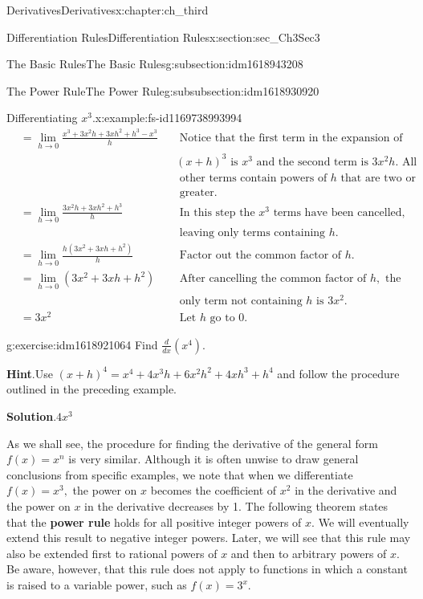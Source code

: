\documentclass[oneside,10pt,]{book}
\newcommand{\blocktitlefont}{\relax}
\newcommand{\terminology}[1]{\textbf{#1}}
\numberwithin{equation}{section}
\newcommand{\amp}{&}
\begin{document}
\begin{chapterptx}{Derivatives}{}{Derivatives}{}{}{x:chapter:ch_third}
\begin{sectionptx}{Differentiation Rules}{}{Differentiation Rules}{}{}{x:section:sec_Ch3Sec3}
\begin{subsectionptx}{The Basic Rules}{}{The Basic Rules}{}{}{g:subsection:idm1618943208}
\begin{subsubsectionptx}{The Power Rule}{}{The Power Rule}{}{}{g:subsubsection:idm1618930920}
\begin{example}{Differentiating \(x^3\).}{x:example:fs-id1169738993994}
\begin{align*}
\amp=\lim_{h\to 0}\frac{x^3+3x^2h+3xh^2+h^3-x^3}{h}\amp \amp \text{ Notice that the first term in the expansion of }\\
\amp \amp \amp (x+h)^3 \text{ is } x^3 \text{ and the second term is } 3x^2h. \text{ All }\\
\amp \amp \amp \text{ other terms contain powers of } h \text{ that are two or }\\
\amp \amp \amp \text{ greater. }\\
\amp =\lim_{h\to 0}\frac{3x^2h+3xh^2+h^3}{h}\amp \amp\text{ In this step the } x^3 \text{ terms have been cancelled, }\\
\amp \amp \amp \text{ leaving only terms containing } h.\\
\amp=\lim_{h\to 0}\frac{h(3x^2+3xh+h^2)}{h}\amp \amp \text{ Factor out the common factor of } h.\\
\amp =\lim_{h\to 0}(3x^2+3xh+h^2)\amp \amp \text{ After cancelling the common factor of } h,\text{ the }\\
\amp \amp \amp \text{ only term not containing } h \text{ is } 3x^2.\\
\amp=3x^2\amp \amp \text{ Let } h \text{ go to 0. }
\end{align*}
\end{example}
\begin{inlineexercise}{}{g:exercise:idm1618921064}%
Find \(\frac{d}{dx}(x^4).\)%
\par\smallskip%
\noindent\textbf{\blocktitlefont Hint}.\hypertarget{g:hint:idm1618920808}{}\quad{}Use \((x+h)^4=x^4+4x^3h+6x^2h^2+4xh^3+h^4\) and follow the procedure outlined in the preceding example.%
\par\smallskip%
\noindent\textbf{\blocktitlefont Solution}.\hypertarget{g:solution:idm1618921576}{}\quad{}\(4x^3\)%
\end{inlineexercise}%
As we shall see, the procedure for finding the derivative of the general form \(f(x)=x^n\) is very similar. Although it is often unwise to draw general conclusions from specific examples, we note that when we differentiate \(f(x)=x^3,\) the power on \(x\) becomes the coefficient of \(x^2\) in the derivative and the power on \(x\) in the derivative decreases by 1. The following theorem states that the \terminology{power rule} holds for all positive integer powers of \(x.\) We will eventually extend this result to negative integer powers. Later, we will see that this rule may also be extended first to rational powers of \(x\) and then to arbitrary powers of \(x.\) Be aware, however, that this rule does not apply to functions in which a constant is raised to a variable power, such as \(f(x)=3^x.\)%

\end{subsubsectionptx}
\end{subsectionptx}
\end{sectionptx}
\end{chapterptx}
\end{document}
